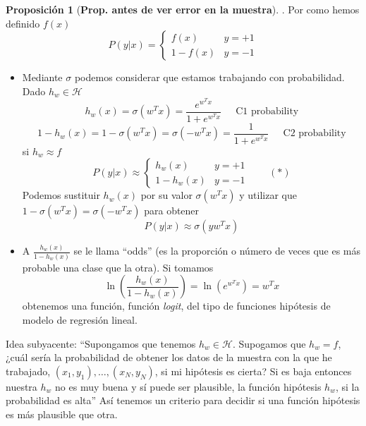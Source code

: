 \documentclass[11pt,a4paper]{article}
\theoremstyle{definition}
\newtheorem{proposition}{Proposición}[section]
\begin{document}
	\begin{proposition}[\bf Prop. antes de ver error en la muestra]. 
	Por como hemos definido $f(x)$
	$$ P(y| x) = \begin{cases} f(x) & y=+1 \\
	1-f(x) & y=-1
	\end{cases}$$
	
	\begin{itemize}
	\item	Mediante $\sigma$ podemos considerar que estamos trabajando con probabilidad. Dado $h_w \in \mathcal{H}$
	$$h_w(x)=\sigma(w^Tx)=\frac{e^{w^Tx}}{1+e^{w^Tx}}\quad \ \ \text{C1 probability}$$
	$$1-h_w(x)= 1-\sigma(w^T x) =\sigma(-w^Tx)=\frac{1}{1+e^{w^Tx}} \quad \ \ \text{C2 probability}$$
	si $h_w \approx f$
	$$P(y| x)\approx \begin{cases} h_w(x) & y=+1\\
	1 - h_w(x) & y=-1
	\end{cases} \quad \quad (*)$$
	Podemos sustituir $h_w(x)$ por su valor $\sigma(w^Tx)$ y utilizar que $1-\sigma(w^Tx)=\sigma(-w^Tx)$ para obtener $$P(y|x)\approx \sigma(yw^Tx)$$
	\item A $\frac{h_w(x)}{1-h_w(x)}$ se le llama ``odds'' (es la proporción o número de veces que es más probable una clase que la otra). Si tomamos 
	$$\ln\left(\frac{h_w(x)}{1-h_w(x)}\right)=\ln\left(e^{w^T x}\right)=w^Tx$$
	obtenemos una función, función \textit{logit}, del tipo de funciones hipótesis de modelo de regresión lineal.
	\end{itemize}
	\end{proposition}
	
	Idea subyacente: ``Supongamos que tenemos $h_w \in \mathcal H$. Supogamos que $h_w=f$, ¿cuál sería la probabilidad de obtener los datos de la muestra con la que he trabajado, $(x_1,y_1),\ldots,(x_N, y_N)$, si mi hipótesis es cierta? Si es baja entonces nuestra $h_w$ no es muy buena y sí puede ser plausible, la función hipótesis $h_w$, si la probabilidad es alta'' Así tenemos un criterio para decidir si una función hipótesis es más plausible que otra.
	
\end{document}
